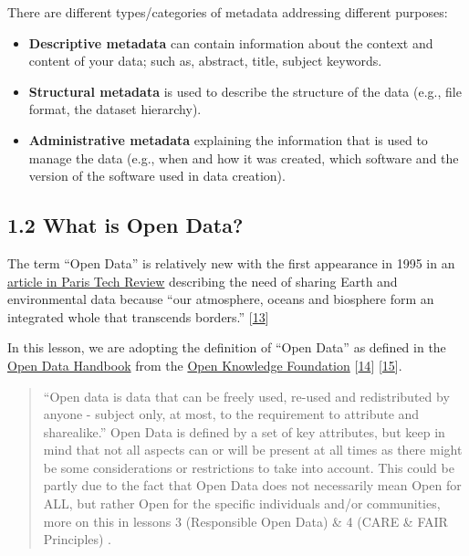 \documentclass[
  letterpaper,
  DIV=11,
  numbers=noendperiod]{scrreport}
\providecommand{\tightlist}{%
  \setlength{\itemsep}{0pt}\setlength{\parskip}{0pt}}\usepackage{longtable,booktabs,array}
\begin{document}
There are different types/categories of metadata addressing different
purposes:

\begin{itemize}
\tightlist
\item
  \textbf{Descriptive metadata} can contain information about the
  context and content of your data; such as, abstract, title, subject
  keywords.
\item
  \textbf{Structural metadata} is used to describe the structure of the
  data (e.g., file format, the dataset hierarchy).
\item
  \textbf{Administrative metadata} explaining the information that is
  used to manage the data (e.g., when and how it was created, which
  software and the version of the software used in data creation).
\end{itemize}

\hypertarget{what-is-open-data}{%
\subsection*{1.2 What is Open Data?}\label{what-is-open-data}}

The term ``Open Data'' is relatively new with the first appearance in
1995 in an
\href{http://www.paristechreview.com/2013/03/29/brief-history-open-data/}{article
in Paris Tech Review} describing the need of sharing Earth and
environmental data because ``our atmosphere, oceans and biosphere form
an integrated whole that transcends borders.''
{[}\href{http://www.paristechreview.com/2013/03/29/brief-history-open-data/}{13}{]}

In this lesson, we are adopting the definition of ``Open Data'' as
defined in the \href{https://opendatahandbook.org/}{Open Data Handbook}
from the \href{https://okfn.org/}{Open Knowledge Foundation}
{[}\href{https://opendatahandbook.org/}{14}{]}
{[}\href{https://okfn.org/}{15}{]}.

\begin{quote}
``Open data is data that can be freely used, re-used and redistributed
by anyone - subject only, at most, to the requirement to attribute and
sharealike.'' Open Data is defined by a set of key attributes, but keep
in mind that not all aspects can or will be present at all times as
there might be some considerations or restrictions to take into account.
This could be partly due to the fact that Open Data does not necessarily
mean Open for ALL, but rather Open for the specific individuals and/or
communities, more on this in lessons 3 (Responsible Open Data) \& 4
(CARE \& FAIR Principles) .
\end{quote}
\end{document}
